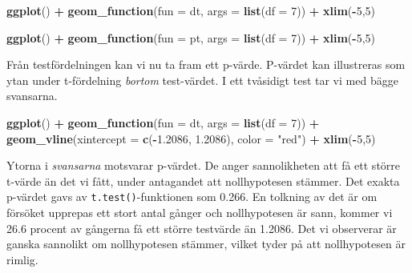 \documentclass[
]{book}
\newenvironment{Shaded}{\begin{snugshade}}{\end{snugshade}}
\newcommand{\AttributeTok}[1]{\textcolor[rgb]{0.13,0.29,0.53}{#1}}
\newcommand{\DecValTok}[1]{\textcolor[rgb]{0.00,0.00,0.81}{#1}}
\newcommand{\FloatTok}[1]{\textcolor[rgb]{0.00,0.00,0.81}{#1}}
\newcommand{\FunctionTok}[1]{\textcolor[rgb]{0.13,0.29,0.53}{\textbf{#1}}}
\newcommand{\NormalTok}[1]{#1}
\newcommand{\SpecialCharTok}[1]{\textcolor[rgb]{0.81,0.36,0.00}{\textbf{#1}}}
\newcommand{\StringTok}[1]{\textcolor[rgb]{0.31,0.60,0.02}{#1}}
\theoremstyle{definition}
\theoremstyle{definition}
\theoremstyle{definition}
\theoremstyle{definition}
\theoremstyle{remark}
\begin{document}
\begin{Shaded}
\begin{Highlighting}[]
\FunctionTok{ggplot}\NormalTok{() }\SpecialCharTok{+}
  \FunctionTok{geom\_function}\NormalTok{(}\AttributeTok{fun =}\NormalTok{ dt, }\AttributeTok{args =} \FunctionTok{list}\NormalTok{(}\AttributeTok{df =} \DecValTok{7}\NormalTok{)) }\SpecialCharTok{+}
  \FunctionTok{xlim}\NormalTok{(}\SpecialCharTok{{-}}\DecValTok{5}\NormalTok{,}\DecValTok{5}\NormalTok{)}
\end{Highlighting}
\end{Shaded}

\begin{Shaded}
\begin{Highlighting}[]
\FunctionTok{ggplot}\NormalTok{() }\SpecialCharTok{+}
  \FunctionTok{geom\_function}\NormalTok{(}\AttributeTok{fun =}\NormalTok{ pt, }\AttributeTok{args =} \FunctionTok{list}\NormalTok{(}\AttributeTok{df =} \DecValTok{7}\NormalTok{)) }\SpecialCharTok{+}
  \FunctionTok{xlim}\NormalTok{(}\SpecialCharTok{{-}}\DecValTok{5}\NormalTok{,}\DecValTok{5}\NormalTok{)}
\end{Highlighting}
\end{Shaded}

Från testfördelningen kan vi nu ta fram ett p-värde. P-värdet kan illustreras som ytan under t-fördelning \emph{bortom} test-värdet. I ett tvåsidigt test tar vi med bägge svansarna.

\begin{Shaded}
\begin{Highlighting}[]
\FunctionTok{ggplot}\NormalTok{() }\SpecialCharTok{+}
  \FunctionTok{geom\_function}\NormalTok{(}\AttributeTok{fun =}\NormalTok{ dt, }\AttributeTok{args =} \FunctionTok{list}\NormalTok{(}\AttributeTok{df =} \DecValTok{7}\NormalTok{)) }\SpecialCharTok{+}
  \FunctionTok{geom\_vline}\NormalTok{(}\AttributeTok{xintercept =} \FunctionTok{c}\NormalTok{(}\SpecialCharTok{{-}}\FloatTok{1.2086}\NormalTok{, }\FloatTok{1.2086}\NormalTok{), }
             \AttributeTok{color =} \StringTok{"red"}\NormalTok{) }\SpecialCharTok{+}
  \FunctionTok{xlim}\NormalTok{(}\SpecialCharTok{{-}}\DecValTok{5}\NormalTok{,}\DecValTok{5}\NormalTok{)}
\end{Highlighting}
\end{Shaded}

Ytorna i \emph{svansarna} motsvarar p-värdet. De anger sannolikheten att få ett större t-värde än det vi fått, under antagandet att nollhypotesen stämmer. Det exakta p-värdet gavs av \texttt{t.test()}-funktionen som 0.266. En tolkning av det är om försöket upprepas ett stort antal gånger och nollhypotesen är sann, kommer vi 26.6 procent av gångerna få ett större testvärde än 1.2086. Det vi observerar är ganska sannolikt om nollhypotesen stämmer, vilket tyder på att nollhypotesen är rimlig.
\end{document}
